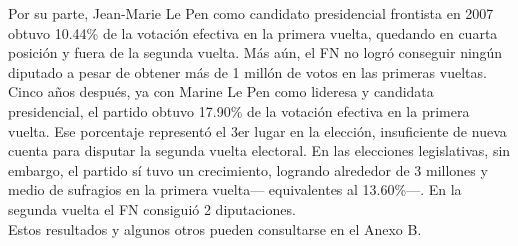 Por su parte, Jean-Marie Le Pen como candidato presidencial frontista en 2007 obtuvo 10.44\% de la votación efectiva en la primera vuelta, quedando en cuarta posición y fuera de la segunda vuelta. Más aún, el FN no logró conseguir ningún diputado a pesar de obtener más de 1 millón de votos en las primeras vueltas. Cinco años después, ya con Marine Le Pen como lideresa y candidata presidencial, el partido obtuvo 17.90\% de la votación efectiva en la primera vuelta. Ese porcentaje representó el 3er lugar en la elección, insuficiente de nueva cuenta para disputar la segunda vuelta electoral. En las elecciones legislativas, sin embargo, el partido sí tuvo un crecimiento, logrando alrededor de 3 millones y medio de sufragios en la primera vuelta--- equivalentes al 13.60\%---. En la segunda vuelta el FN consiguió 2 diputaciones.\\ 

Estos resultados y algunos otros pueden consultarse en el {\color{Red} Anexo B}.